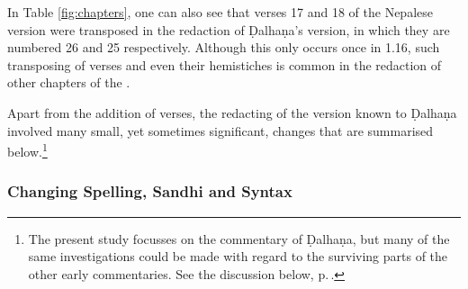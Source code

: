 In Table \ref{fig:chapters}, one can also see that verses 17 and 18 of the
Nepalese version were transposed in the redaction of Ḍalhaṇa's version, in which
they are numbered 26 and 25 respectively. Although this only occurs once in 1.16,
such transposing of verses and even their hemistiches is common in the
redaction of other chapters of the \SS.

Apart from the addition of verses, the redacting of the version known to Ḍalhaṇa involved 
many small, yet sometimes significant, changes that are summarised below.\footnote{The 
present study focusses on the commentary of Ḍalhaṇa, but many of the same investigations
    could be made with regard to the surviving parts of the other early commentaries. See the 
    discussion below, p.\,\pageref{ref:dalhana}.}

\subsubsection{Changing Spelling, Sandhi and Syntax}


